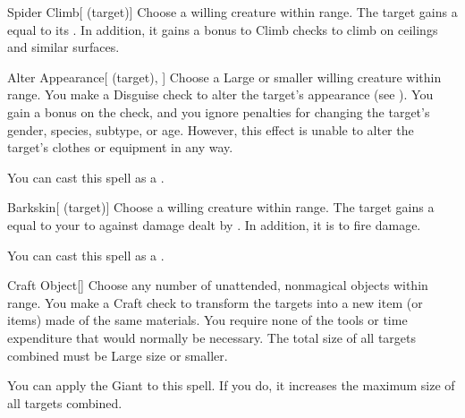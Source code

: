 \lowercase{\hypertarget{spell:Spider Climb}{}}\label{spell:Spider Climb}
\begin{attuneability}[\nth{1}]{\hypertarget{spell:Spider Climb}{Spider Climb}}[ (target)]
Choose a willing creature within \rngclose range.
The target gains a  equal to its .
In addition, it gains a  bonus to Climb checks to climb on ceilings and similar surfaces.
\end{attuneability}
\vspace{0.25em}



\lowercase{\hypertarget{spell:Alter Appearance}{}}\label{spell:Alter Appearance}
\begin{attuneability}[\nth{2}]{\hypertarget{spell:Alter Appearance}{Alter Appearance}}[ (target), ]
Choose a Large or smaller willing creature within \rngclose range.
You make a Disguise check to alter the target's appearance (see ).
You gain a  bonus on the check, and you ignore penalties for changing the target's gender, species, subtype, or age.
However, this effect is unable to alter the target's clothes or equipment in any way.

You can cast this spell as a .
\end{attuneability}
\vspace{0.25em}



\lowercase{\hypertarget{spell:Barkskin}{}}\label{spell:Barkskin}
\begin{attuneability}[\nth{2}]{\hypertarget{spell:Barkskin}{Barkskin}}[ (target)]
Choose a willing creature within \rngclose range.
The target gains a  equal to your  to  against damage dealt by .
In addition, it is  to fire damage.

You can cast this spell as a .
\end{attuneability}
\vspace{0.25em}



\lowercase{\hypertarget{spell:Craft Object}{}}\label{spell:Craft Object}
\begin{apability}[\nth{3}]{\hypertarget{spell:Craft Object}{Craft Object}}[]
Choose any number of unattended, nonmagical objects within \rngclose range.
You make a Craft check to transform the targets into a new item (or items) made of the same materials.
You require none of the tools or time expenditure that would normally be necessary.
The total size of all targets combined must be Large size or smaller.

You can apply the Giant  to this spell.
If you do, it increases the maximum size of all targets combined.
\end{apability}
\vspace{0.25em}



